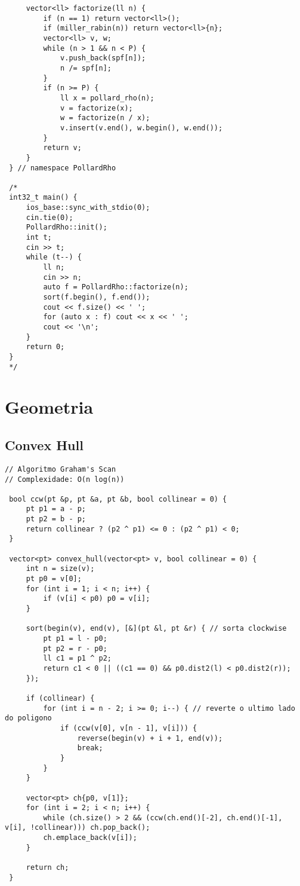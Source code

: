 \documentclass[11pt, a4paper, twoside]{article}
\begin{document}
\begin{lstlisting}
     vector<ll> factorize(ll n) {
         if (n == 1) return vector<ll>();
         if (miller_rabin(n)) return vector<ll>{n};
         vector<ll> v, w;
         while (n > 1 && n < P) {
             v.push_back(spf[n]);
             n /= spf[n];
         }
         if (n >= P) {
             ll x = pollard_rho(n);
             v = factorize(x);
             w = factorize(n / x);
             v.insert(v.end(), w.begin(), w.end());
         }
         return v;
     }
 } // namespace PollardRho
 
 /*
 int32_t main() {
     ios_base::sync_with_stdio(0);
     cin.tie(0);
     PollardRho::init();
     int t;
     cin >> t;
     while (t--) {
         ll n;
         cin >> n;
         auto f = PollardRho::factorize(n);
         sort(f.begin(), f.end());
         cout << f.size() << ' ';
         for (auto x : f) cout << x << ' ';
         cout << '\n';
     }
     return 0;
 }
 */
\end{lstlisting}

\clearpage


%
%

\section{Geometria}

\subsection{Convex Hull}
\begin{lstlisting}
// Algoritmo Graham's Scan
// Complexidade: O(n log(n))

 bool ccw(pt &p, pt &a, pt &b, bool collinear = 0) {
     pt p1 = a - p;
     pt p2 = b - p;
     return collinear ? (p2 ^ p1) <= 0 : (p2 ^ p1) < 0;
 }
 
 vector<pt> convex_hull(vector<pt> v, bool collinear = 0) {
     int n = size(v);
     pt p0 = v[0];
     for (int i = 1; i < n; i++) {
         if (v[i] < p0) p0 = v[i];
     }
 
     sort(begin(v), end(v), [&](pt &l, pt &r) { // sorta clockwise
         pt p1 = l - p0;
         pt p2 = r - p0;
         ll c1 = p1 ^ p2;
         return c1 < 0 || ((c1 == 0) && p0.dist2(l) < p0.dist2(r));
     });
 
     if (collinear) {
         for (int i = n - 2; i >= 0; i--) { // reverte o ultimo lado do poligono
             if (ccw(v[0], v[n - 1], v[i])) {
                 reverse(begin(v) + i + 1, end(v));
                 break;
             }
         }
     }
 
     vector<pt> ch{p0, v[1]};
     for (int i = 2; i < n; i++) {
         while (ch.size() > 2 && (ccw(ch.end()[-2], ch.end()[-1], v[i], !collinear))) ch.pop_back();
         ch.emplace_back(v[i]);
     }
 
     return ch;
 }
\end{lstlisting}
\end{document}
